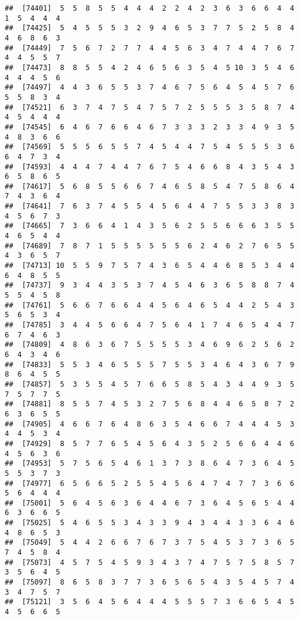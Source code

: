 \documentclass[
]{book}
\begin{document}
\begin{verbatim}
##  [74401]  5  5  8  5  5  4  4  4  2  2  4  2  3  6  3  6  6  4  4  1  5  4  4  4
##  [74425]  5  4  5  5  5  3  2  9  4  6  5  3  7  7  5  2  5  8  4  4  6  8  6  3
##  [74449]  7  5  6  7  2  7  7  4  4  5  6  3  4  7  4  4  7  6  7  4  4  5  5  7
##  [74473]  8  8  5  5  4  2  4  6  5  6  3  5  4  5 10  3  5  4  6  4  4  4  5  6
##  [74497]  4  4  3  6  5  5  3  7  4  6  7  5  6  4  5  4  5  7  6  5  5  8  3  4
##  [74521]  6  3  7  4  7  5  4  7  5  7  2  5  5  5  3  5  8  7  4  4  5  4  4  4
##  [74545]  6  4  6  7  6  6  4  6  7  3  3  3  2  3  3  4  9  3  5  4  8  3  6  6
##  [74569]  5  5  5  6  5  5  7  4  5  4  4  7  5  4  5  5  5  3  6  6  4  7  3  4
##  [74593]  4  4  4  7  4  4  7  6  7  5  4  6  6  8  4  3  5  4  3  6  5  8  6  5
##  [74617]  5  6  8  5  5  6  6  7  4  6  5  8  5  4  7  5  8  6  4  7  4  3  6  4
##  [74641]  7  6  3  7  4  5  5  4  5  6  4  4  7  5  5  3  3  8  3  4  5  6  7  3
##  [74665]  7  3  6  6  4  1  4  3  5  6  2  5  5  6  6  6  3  5  5  4  6  5  4  4
##  [74689]  7  8  7  1  5  5  5  5  5  5  6  2  4  6  2  7  6  5  5  4  3  6  5  7
##  [74713] 10  5  5  9  7  5  7  4  3  6  5  4  4  6  8  5  3  4  4  6  4  8  5  5
##  [74737]  9  3  4  4  3  5  3  7  4  5  4  6  3  6  5  8  8  7  4  5  5  4  5  8
##  [74761]  5  6  6  7  6  6  4  4  5  6  4  6  5  4  4  2  5  4  3  5  6  5  3  4
##  [74785]  3  4  4  5  6  6  4  7  5  6  4  1  7  4  6  5  4  4  7  6  7  4  6  3
##  [74809]  4  8  6  3  6  7  5  5  5  5  3  4  6  9  6  2  5  6  2  6  4  3  4  6
##  [74833]  5  5  3  4  6  5  5  5  7  5  5  3  4  6  4  3  6  7  9  8  6  4  5  5
##  [74857]  5  3  5  5  4  5  7  6  6  5  8  5  4  3  4  4  9  3  5  7  5  7  7  5
##  [74881]  8  5  5  7  4  5  3  2  7  5  6  8  4  4  6  5  8  7  2  6  3  6  5  5
##  [74905]  4  6  6  7  6  4  8  6  3  5  4  6  6  7  4  4  4  5  3  4  4  5  3  4
##  [74929]  8  5  7  7  6  5  4  5  6  4  3  5  2  5  6  6  4  4  6  4  5  6  3  6
##  [74953]  5  7  5  6  5  4  6  1  3  7  3  8  6  4  7  3  6  4  5  5  5  3  7  3
##  [74977]  6  5  6  6  5  2  5  5  4  5  6  4  7  4  7  7  3  6  6  5  6  4  4  4
##  [75001]  5  6  4  5  6  3  6  4  4  6  7  3  6  4  5  6  5  4  4  6  3  6  6  5
##  [75025]  5  4  6  5  5  3  4  3  3  9  4  3  4  4  3  3  6  4  6  4  8  6  5  3
##  [75049]  5  4  4  2  6  6  7  6  7  3  7  5  4  5  3  7  3  6  5  7  4  5  8  4
##  [75073]  4  5  7  5  4  5  9  3  4  3  7  4  7  5  7  5  8  5  7  3  5  6  4  5
##  [75097]  8  6  5  8  3  7  7  3  6  5  6  5  4  3  5  4  5  7  4  3  4  7  5  7
##  [75121]  3  5  6  4  5  6  4  4  4  5  5  5  7  3  6  6  5  4  5  4  5  6  6  5

\end{verbatim}
\end{document}
